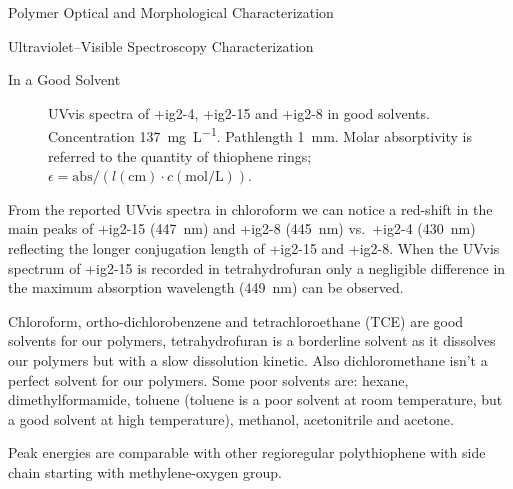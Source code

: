 \begin{section}{Polymer Optical and Morphological Characterization}
\begin{subsection}{Ultraviolet--Visible Spectroscopy Characterization}
\begin{subsubsection}{In a Good Solvent}
\begin{figure}[tbp]%
\caption[UV-vis spectra of \cmpd+{ig2-4}, \cmpd+{ig2-15} and \cmpd+{ig2-8} in good solvents.]{\gls{UVvis} spectra of \cmpd+{ig2-4}, \cmpd+{ig2-15} and \cmpd+{ig2-8} in good solvents. Concentration \SI{137}{\mg\per\liter}. Pathlength \SI{1}{\mm}. Molar absorptivity is referred to the quantity of thio\-phene rings; $\epsilon = \mathrm{abs} / ( l (\mathrm{cm}) \cdot c (\mathrm{mol/L}))$.}
\label{fig:uvvis}
\end{figure}

From the reported \gls{UVvis} spectra in chloroform we can notice a red-shift in the main peaks of \cmpd+{ig2-15} (\SI{447}{\nm}) and \cmpd+{ig2-8} (\SI{445}{\nm}) vs.\ \cmpd+{ig2-4} (\SI{430}{\nm}) reflecting the longer conjugation length of \cmpd+{ig2-15} and \cmpd+{ig2-8}. When the \gls{UVvis} spectrum of \cmpd+{ig2-15} is recorded in tetrahydrofuran only a negligible difference in the maximum absorption wavelength (\SI{449}{\nm}) can be observed. 

Chloroform, ortho-di\-chloro\-benzene and tetra\-chloro\-ethane (\acrshort{TCE}) are good solvents for our polymers, tetrahydrofuran is a borderline solvent as it dissolves our polymers but with a slow dissolution kinetic. Also dichloromethane isn't a perfect solvent for our polymers. Some poor solvents are: \label{poorsolvents} hexane, dimethylformamide, toluene (toluene is a poor solvent at room temperature, but a good solvent at high temperature), methanol, acetonitrile and acetone.

Peak energies are comparable with other regioregular poly\-thio\-phene with side chain starting with methylene-oxy\-gen group.


\end{subsubsection}
\end{subsection}
\end{section}
